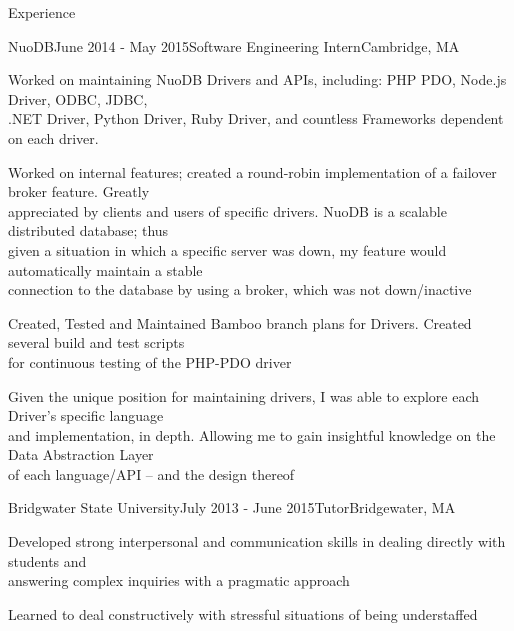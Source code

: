 \documentclass{resume} %
\begin{document}
\begin{rSection}{Experience}

\begin{rSubsection}{NuoDB}{June 2014 - May 2015}{Software Engineering Intern}{Cambridge, MA}
 	      \item Worked on maintaining NuoDB Drivers and APIs, including: PHP PDO, Node.js Driver, ODBC, JDBC,\\ .NET Driver, Python Driver, Ruby Driver, and countless Frameworks dependent on each driver.
          \item Worked on internal features; created a round-robin implementation of a failover broker feature. Greatly \\appreciated by clients and users of specific drivers. NuoDB is a scalable distributed database; thus\\ given a situation in which a specific server was down, my feature would automatically maintain a stable\\ connection to the database by using a broker, which was not down/inactive
          \item Created, Tested and Maintained Bamboo branch plans for Drivers. Created several build and test scripts\\ for continuous testing of the PHP-PDO driver
          \item Given the unique position for maintaining drivers, I was able to explore each Driver’s specific language\\ and implementation, in depth. Allowing me to gain insightful knowledge on the Data Abstraction Layer\\ of each language/API – and the design thereof
\end{rSubsection}


\begin{rSubsection}{Bridgwater State University}{July 2013 - June 2015}{Tutor}{Bridgewater, MA}
 	      \item Developed strong interpersonal and communication skills in dealing directly with students and \\ answering complex inquiries with a pragmatic approach
          \item Learned to deal constructively with stressful situations of being understaffed
\end{rSubsection}


\end{rSection}
\end{document}
